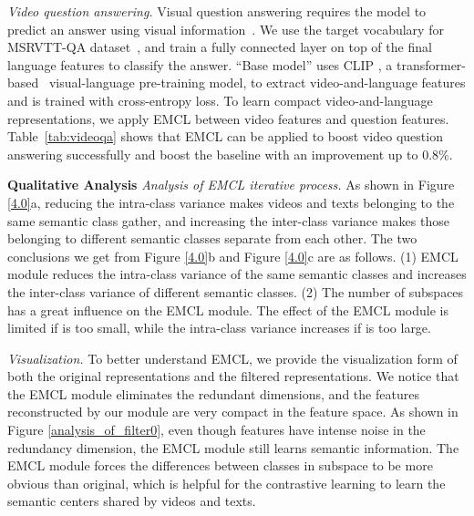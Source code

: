 \documentclass{article}
\newcommand{\myparagraph}[1]{\textbf{#1}\hspace{1.8ex}}
\newcommand{\mysubparagraph}[1]{\textit{#1}\hspace{1.8ex}}
\begin{document}
\mysubparagraph{Video question answering.}
Visual question answering requires the model to predict an answer using visual information~\cite{li2022joint,li2022toward}. We use the target vocabulary for MSRVTT-QA dataset~\cite{xu2017video}, and train a fully connected layer on top of the final language features to classify the answer. ``Base model'' uses CLIP \cite{radford2021learning}, a transformer-based~\cite{dosovitskiy2021an,li2022locality} visual-language pre-training model, to extract video-and-language features and is trained with cross-entropy loss. To learn compact video-and-language representations, we apply EMCL between video features and question features. Table~\ref{tab:videoqa} shows that EMCL can be applied to boost video question answering successfully and boost the baseline with an improvement up to 0.8\%.

\myparagraph{Qualitative Analysis}
\mysubparagraph{Analysis of EMCL iterative process.} As shown in Figure \ref{4.0}a, reducing the intra-class variance makes videos and texts belonging to the same semantic class gather, and increasing the inter-class variance makes those belonging to different semantic classes separate from each other. The two conclusions we get from Figure \ref{4.0}b and Figure \ref{4.0}c are as follows.
(1) EMCL module reduces the intra-class variance of the same semantic classes and increases the inter-class variance of different semantic classes. 
(2) The number  of subspaces has a great influence on the EMCL module. The effect of the EMCL module is limited if  is too small, while the intra-class variance increases if  is too large. 

\mysubparagraph{Visualization.} 
To better understand EMCL, we provide the visualization form of both the original representations and the filtered representations. 
We notice that the EMCL module eliminates the redundant dimensions, and the features reconstructed by our module  are very compact in the feature space. 
As shown in Figure \ref{analysis_of_filter0}, even though features have intense noise in the redundancy dimension, the EMCL module still learns semantic information. The EMCL module forces the differences between classes in subspace to be more obvious than original, which is helpful for the contrastive learning to learn the semantic centers shared by videos and texts.

\vspace{-5pt}
\end{document}
